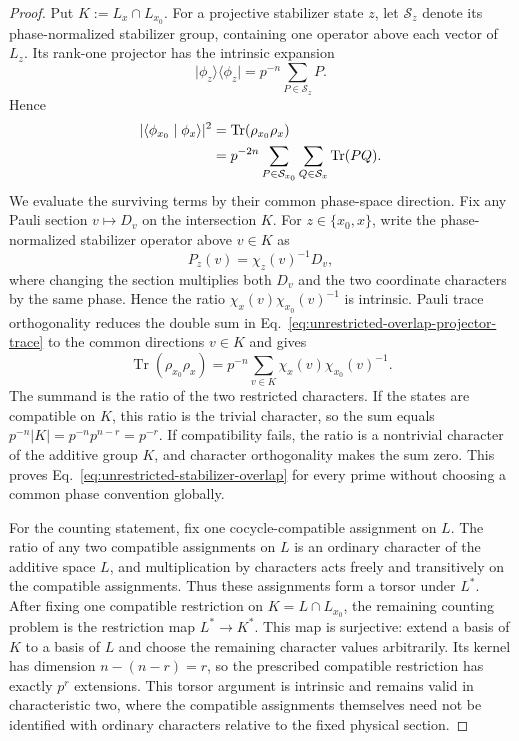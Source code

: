 \documentclass[11pt]{article}
\newcommand{\Tr}{\operatorname{Tr}}
\newcommand{\1}{\mathbf 1}
\newcommand{\ket}[1]{\lvert #1\rangle}
\newcommand{\bra}[1]{\langle #1\rvert}
\theoremstyle{plain}
\theoremstyle{definition}
\theoremstyle{remark}
\begin{document}
\begin{proof}
Put $K:=L_x\cap L_{x_0}$.  For a projective stabilizer state $z$, let
$\mathcal S_z$ denote its phase-normalized stabilizer group, containing one
operator above each vector of $L_z$.  Its rank-one projector has the intrinsic
expansion
\begin{equation}
 \ket{\phi_z}\!\bra{\phi_z}
 =p^{-n}\sum_{P\in\mathcal S_z}P.
 \label{eq:unrestricted-stabilizer-projector-expansion}
\end{equation}
Hence
\begin{align}
 \lvert\langle\phi_{x_0}\mid\phi_x\rangle\rvert^2
 &=\Tr(\rho_{x_0}\rho_x)\notag\\
 &=p^{-2n}\sum_{P\in\mathcal S_{x_0}}
                 \sum_{Q\in\mathcal S_x}\Tr(PQ).
 \label{eq:unrestricted-overlap-projector-trace}
\end{align}
We evaluate the surviving terms by their common phase-space direction.  Fix
any Pauli section $v\mapsto D_v$ on the intersection $K$.  For
$z\in\{x_0,x\}$, write the phase-normalized stabilizer operator above
$v\in K$ as
\begin{equation}
 P_z(v)=\chi_z(v)^{-1}D_v,
 \label{eq:unrestricted-common-direction-representative}
\end{equation}
where changing the section multiplies both $D_v$ and the two coordinate
characters by the same phase.  Hence the ratio
$\chi_x(v)\chi_{x_0}(v)^{-1}$ is intrinsic.  Pauli trace orthogonality reduces
the double sum in
Eq.~\eqref{eq:unrestricted-overlap-projector-trace} to the common directions
$v\in K$ and gives
\begin{equation}
 \Tr(\rho_{x_0}\rho_x)
 =p^{-n}\sum_{v\in K}
 \chi_x(v)\chi_{x_0}(v)^{-1}.
 \label{eq:unrestricted-overlap-common-character-sum}
\end{equation}
The summand is the ratio of the two restricted characters.  If the states are
compatible on $K$, this ratio is the trivial character, so the sum equals
$p^{-n}|K|=p^{-n}p^{n-r}=p^{-r}$.  If compatibility fails, the ratio is a
nontrivial character of the additive group $K$, and character orthogonality
makes the sum zero.  This proves
Eq.~\eqref{eq:unrestricted-stabilizer-overlap} for every prime without choosing
a common phase convention globally.

For the counting statement, fix one cocycle-compatible assignment on $L$.
The ratio of any two compatible assignments on $L$ is an ordinary character
of the additive space $L$, and multiplication by characters acts freely and
transitively on the compatible assignments.  Thus these assignments form a
torsor under $L^*$.  After fixing one compatible restriction on
$K=L\cap L_{x_0}$, the remaining counting problem is the restriction map
$L^*\to K^*$.  This map is surjective: extend a basis of $K$ to a basis of
$L$ and choose the remaining character values arbitrarily.  Its kernel has
dimension $n-(n-r)=r$, so the prescribed compatible restriction has exactly
$p^r$ extensions.  This torsor argument is intrinsic and remains valid in
characteristic two, where the compatible assignments themselves need not be
identified with ordinary characters relative to the fixed physical section.
\end{proof}
\end{document}
